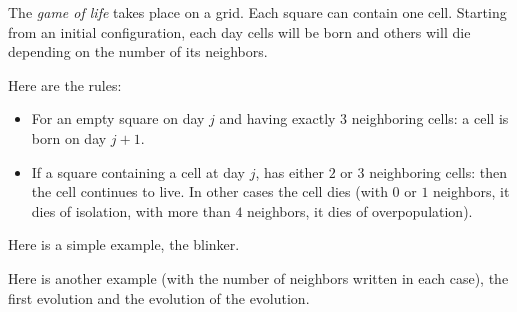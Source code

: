 \documentclass[11pt,class=report,crop=false]{standalone}
\begin{document}
\begin{cours}
The \emph{game of life} takes place on a grid. Each square can contain one cell. Starting from an initial configuration, each day cells will be born and others will die depending on the number of its neighbors.

Here are the rules:
\begin{itemize}
  \item For an empty square on day $j$ and having exactly $3$ neighboring cells: a cell is born on day $j+1$.


  \item If a square containing a cell at day $j$, has either $2$ or $3$ neighboring cells: then the cell continues to live.
  In other cases the cell dies (with $0$ or $1$ neighbors, it dies of isolation, with more than $4$ neighbors, it dies of overpopulation).
  
  \medskip
  

   \medskip
    
\end{itemize}

Here is a simple example, the \og{}blinker\fg{}.

 
Here is another example (with the number of neighbors written in each case), the first evolution and the evolution of the evolution.

\end{cours}



\end{document}
